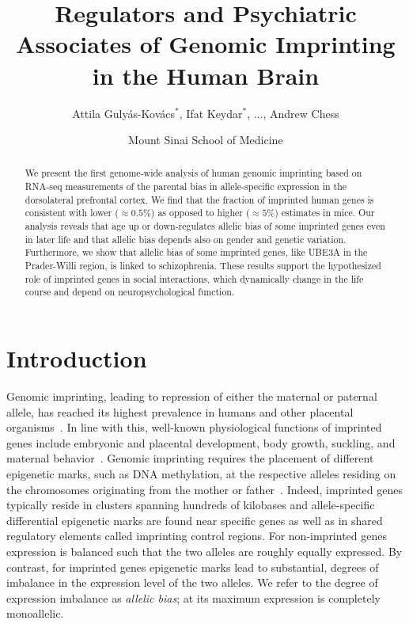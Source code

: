 \documentclass[12pt,letterpaper]{article}
\title{Regulators and Psychiatric Associates of Genomic Imprinting in the Human Brain}
\author{Attila Guly\'{a}s-Kov\'{a}cs\(^\ast\), Ifat Keydar\(^\ast\),
...,
Andrew Chess}
\date{Mount Sinai School of Medicine}
\begin{document}
\maketitle

\begin{abstract}
We present the first genome-wide analysis of human genomic imprinting based on
RNA-seq measurements of the parental bias in allele-specific expression in the
dorsolateral prefrontal cortex.  We find that the fraction of imprinted human
genes is consistent with lower (\(\approx 0.5\%\)) as opposed to higher
(\(\approx 5\%\)) estimates in mice.  Our analysis reveals that age up or
down-regulates allelic bias of some imprinted genes even in later life and
that allelic bias depends also on gender and genetic variation.  Furthermore,
we show that allelic bias of some imprinted genes, like UBE3A in the
Prader-Willi region, is linked to schizophrenia.  These results support the
hypothesized role of imprinted genes in social interactions, which dynamically
change in the life course and depend on neuropsychological function.
\end{abstract}

\section{Introduction}

Genomic imprinting, leading to repression of either the maternal or paternal
allele, has reached its highest prevalence in humans and other placental
organisms~\cite{Renfree2012}.  In line with this, well-known physiological
functions of imprinted genes include embryonic and placental development, body
growth, suckling, and maternal behavior~\cite{Plasschaert2014,Peters2014}.
Genomic imprinting requires the placement of different epigenetic marks, such
as DNA methylation, at the respective alleles residing on the chromosomes
originating from the mother or father~\cite{Plasschaert2014}.  Indeed,
imprinted genes typically reside in clusters spanning hundreds of kilobases
and allele-specific differential epigenetic marks are found near specific
genes as well as in shared regulatory elements called imprinting control
regions. For non-imprinted genes expression is balanced such that the two
alleles are roughly equally expressed. By contrast, for imprinted genes
epigenetic marks lead to substantial, degrees of
imbalance in the expression level of the two alleles.  We refer to the degree
of expression imbalance as \emph{allelic bias}; at its maximum expression is
completely monoallelic.
\end{document}
